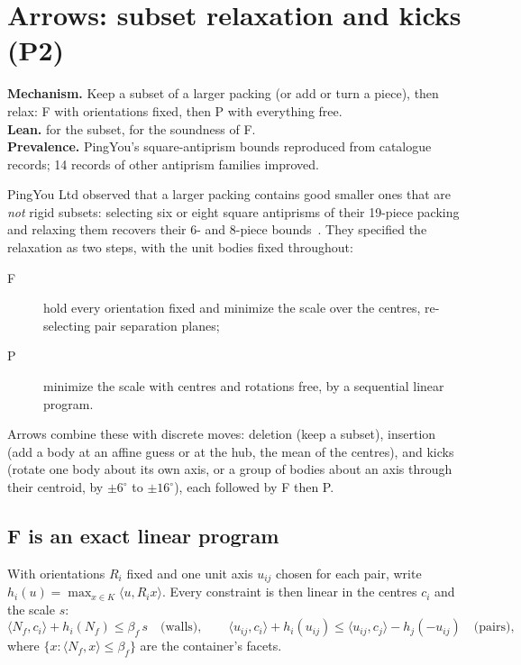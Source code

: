 \documentclass[11pt,a4paper]{article}
\begin{document}
\section{Arrows: subset relaxation and kicks (P2)}\label{sec:arrows}

\begin{summarybox}
\textbf{Mechanism.} Keep a subset of a larger packing (or add or turn a piece), then relax: F with orientations fixed, then P with everything free.\\
\textbf{Lean.}  for the subset,  for the soundness of F.\\
\textbf{Prevalence.} PingYou's square-antiprism bounds reproduced from catalogue records; 14 records of other antiprism families improved.
\end{summarybox}

PingYou Ltd observed that a larger packing contains good smaller ones that are \emph{not} rigid subsets: selecting six or eight square antiprisms of their 19-piece packing and relaxing them recovers their 6- and 8-piece bounds~\cite{pingArrows}. They specified the relaxation as two steps, with the unit bodies fixed throughout:
\begin{description}
\item[F] hold every orientation fixed and minimize the scale over the centres, re-selecting pair separation planes;
\item[P] minimize the scale with centres and rotations free, by a sequential linear program.
\end{description}
Arrows combine these with discrete moves: deletion (keep a subset), insertion (add a body at an affine guess or at the hub, the mean of the centres), and kicks (rotate one body about its own axis, or a group of bodies about an axis through their centroid, by $\pm 6^\circ$ to $\pm 16^\circ$), each followed by F then P.

\subsection{F is an exact linear program}
With orientations $R_i$ fixed and one unit axis $u_{ij}$ chosen for each pair, write $h_i(u)=\max_{x\in K}\langle u,R_i x\rangle$. Every constraint is then linear in the centres $c_i$ and the scale $s$:
\begin{equation}\label{eq:F}
\langle N_f,c_i\rangle+h_i(N_f)\le \beta_f\,s\quad\text{(walls)},\qquad
\langle u_{ij},c_i\rangle+h_i(u_{ij})\le \langle u_{ij},c_j\rangle-h_j(-u_{ij})\quad\text{(pairs)},
\end{equation}
where $\{x:\langle N_f,x\rangle\le\beta_f\}$ are the container's facets.
\end{document}
